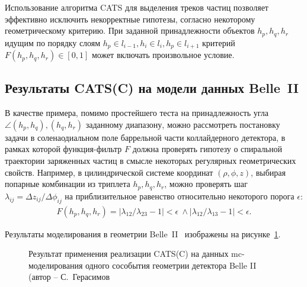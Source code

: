 Использование алгоритма CATS для выделения треков частиц
позволяет эффективно исключить некорректные гипотезы, согласно
некоторому геометрическому критерию. При заданной принадлежности
объектов $h_p,h_q,h_r$ идущим по порядку
слоям $h_p\in l_{i-1}, h_i \in l_i, h_p\in l_{i+1}$ критерий $F(h_{p}, h_q, h_{r}) \in [0,1]$ может включать произвольное условие.

\subsection{Результаты CATS(C) на модели данных Belle~II}

В качестве примера, помимо простейшего теста на принадлежность угла
$\angle(h_p,h_q),(h_q,h_r)$ заданному диапазону, можно рассмотреть
постановку задачи в соленаодиальном поле баррельной части коллайдерного
детектора, в рамках которой функция-фильтр $F$ должна проверять
гипотезу о спиральной траектории заряженных частиц в смысле некоторых
регулярных геометрических свойств. Например, в цилиндрической системе
координат $(\rho, \phi, z)$, выбирая попарные комбинации из триплета $h_{p}, h_q, h_{r}$,
можно проверять шаг $\lambda_{ij} = \Delta z_{ij}/\Delta \phi_{ij}$
на приблизительное равенство относительно некоторого порога $\epsilon$:
\begin{align}
    F(h_{p}, h_q, h_{r}) = |\lambda_{12} / \lambda_{23} - 1| <\epsilon ~
    \wedge |\lambda_{12} / \lambda_{13} - 1| <\epsilon.
\end{align}

Результаты моделирования в геометрии Belle~II~\cite{belle-ii} изображены на
рисунке~\ref{fig:belle-ii-mc-event}.
\begin{figure}[ht]
    \caption{Результат применения реализации CATS(C) на данных \acrshort{mc}-моделирования
    одного сособытия геометрии детектора Belle II~\cite{belle-ii} 
    (автор -- С.~Герасимов}
    \label{fig:belle-ii-mc-event}
\end{figure}


